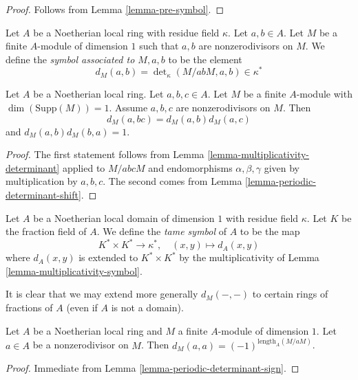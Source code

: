 \begin{proof}
Follows from Lemma \ref{lemma-pre-symbol}.
\end{proof}

\begin{definition}
\label{definition-symbol-M}
Let $A$ be a Noetherian local ring with residue field $\kappa$.
Let $a, b \in A$.
Let $M$ be a finite $A$-module of dimension $1$
such that $a, b$ are nonzerodivisors on $M$.
We define the {\it symbol associated to $M, a, b$}
to be the element
$$
d_M(a, b) =
\det\nolimits_\kappa(M/abM, a, b) \in \kappa^*
$$
\end{definition}

\begin{lemma}
\label{lemma-multiplicativity-symbol}
Let $A$ be a Noetherian local ring.
Let $a, b, c \in A$. Let $M$ be a finite $A$-module
with $\dim(\text{Supp}(M)) = 1$. Assume $a, b, c$ are nonzerodivisors on $M$.
Then
$$
d_M(a, bc) = d_M(a, b) d_M(a, c)
$$
and $d_M(a, b)d_M(b, a) = 1$.
\end{lemma}

\begin{proof}
The first statement follows from Lemma \ref{lemma-multiplicativity-determinant}
applied to $M/abcM$ and endomorphisms $\alpha, \beta, \gamma$ given by
multiplication by $a, b, c$.
The second comes from Lemma \ref{lemma-periodic-determinant-shift}.
\end{proof}

\begin{definition}
\label{definition-tame-symbol}
Let $A$ be a Noetherian local domain of dimension $1$
with residue field $\kappa$.
Let $K$ be the fraction field of $A$.
We define the {\it tame symbol} of $A$ to be the map
$$
K^* \times K^* \longrightarrow \kappa^*,
\quad
(x, y) \longmapsto d_A(x, y)
$$
where $d_A(x, y)$ is extended to $K^* \times K^*$ by the multiplicativity of
Lemma \ref{lemma-multiplicativity-symbol}.
\end{definition}

\noindent
It is clear that we may extend more generally $d_M(-, -)$ to
certain rings of fractions of $A$ (even if $A$ is not a domain).

\begin{lemma}
\label{lemma-symbol-when-equal}
Let $A$ be a Noetherian local ring and $M$ a finite $A$-module of
dimension $1$. Let $a \in A$ be a nonzerodivisor on $M$.
Then $d_M(a, a) = (-1)^{\text{length}_A(M/aM)}$.
\end{lemma}

\begin{proof}
Immediate from Lemma \ref{lemma-periodic-determinant-sign}.
\end{proof}

